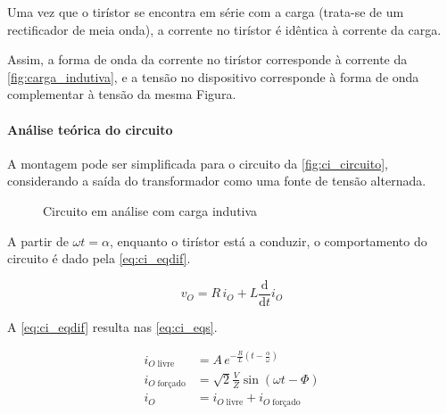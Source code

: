 \documentclass[a4paper,11pt]{article}
\numberwithin{equation}{section}
\begin{document}
Uma vez que o tirístor se encontra em série com a carga (trata-se de um rectificador de meia onda), a corrente no tirístor é idêntica à corrente da carga.

Assim, a forma de onda da corrente no tirístor corresponde à corrente da \autoref{fig:carga_indutiva}, e a tensão no dispositivo corresponde à forma de onda complementar à tensão da mesma Figura.

\paragraph{Análise teórica do circuito}

A montagem pode ser simplificada para o circuito da \autoref{fig:ci_circuito}, considerando a saída do transformador como uma fonte de tensão alternada.

\begin{figure}[h]
	\centering
	\caption{Circuito em análise com carga indutiva}
	\label{fig:ci_circuito}
\end{figure}

A partir de $\omega t = \alpha$, enquanto o tirístor está a conduzir, o comportamento do circuito é dado pela \autoref{eq:ci_eqdif}.

\begin{equation}
\label{eq:ci_eqdif}
v_O = R\,i_{O} + L \frac{\mathrm{d}}{\mathrm{d}t}i_O
\end{equation}

A \autoref{eq:ci_eqdif} resulta nas \autoref{eq:ci_eqs}.

\begin{subequations}
\label{eq:ci_eqs}
\begin{align}
i_{O\;\text{livre}} &= A\,e^{-\frac{R}{L}(t - \frac{\alpha}{\omega})}\\
i_{O\;\text{forçado}} &= \sqrt{2} \frac{V}{Z} \sin{(\omega t - \Phi)}\\
i_O &= i_{O\;\text{livre}} + i_{O\;\text{forçado}}
\end{align}
\end{subequations}
\end{document}
